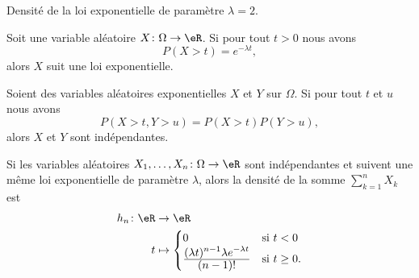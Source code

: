 Densité de la loi exponentielle de paramètre \( \lambda=2\).

\begin{center}
	
\end{center}

\begin{proposition}	\label{PROPooKLJIooUFfGwa}
	Soit une variable aléatoire \(X \colon \Omega\to \eR  \). Si pour tout \( t>0\) nous avons
	\begin{equation}
		P(X>t)=e^{-\lambda t},
	\end{equation}
	alors \( X\) suit une loi exponentielle.
\end{proposition}

\begin{proposition}	\label{PROPooXRMWooYjPMWN}
	Soient des variables aléatoires exponentielles \( X\) et \( Y\) sur \( \Omega\). Si pour tout \( t\) et \( u\) nous avons
	\begin{equation}
		P(X>t,Y>u)=P(X>t)P(Y>u),
	\end{equation}
	alors \( X\) et \( Y\) sont indépendantes.
\end{proposition}

\begin{proposition}	\label{PROPooBZREooUTvonZ}
	Si les variables aléatoires \(X_1,\ldots,X_n \colon \Omega\to \eR    \) sont indépendantes et suivent une même loi exponentielle de paramètre \( \lambda\), alors la densité de la somme \( \sum_{k=1}^nX_k \) est
	\begin{equation}		\label{EQooSCJHooUWxrgs}
		\begin{aligned}
			h_n\colon \eR & \to \eR                                                                                                                       \\
			t             & \mapsto \begin{cases}
				                        0                                                                                      & \text{si } t<0      \\
				                        \frac{ \displaystyle (\lambda t)^{n-1}\lambda e^{-\lambda t} }{ \displaystyle (n-1)! } & \text{si } t\geq 0.
			                        \end{cases}
		\end{aligned}
	\end{equation}
\end{proposition}

